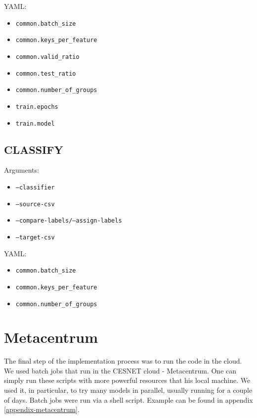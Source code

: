 \noindent
YAML:

\begin{itemize}

\item \texttt{common.batch\_size}
\item \texttt{common.keys\_per\_feature}
\item \texttt{common.valid\_ratio}
\item \texttt{common.test\_ratio}
\item \texttt{common.number\_of\_groups}
\item \texttt{train.epochs}
\item \texttt{train.model}

\end{itemize}

\subsection*{CLASSIFY}

\noindent
Arguments:

\begin{itemize}

\item \texttt{--classifier}
\item \texttt{--source-csv}
\item \texttt{--compare-labels/--assign-labels}
\item \texttt{--target-csv}

\end{itemize}

\noindent
YAML:

\begin{itemize}

\item \texttt{common.batch\_size}
\item \texttt{common.keys\_per\_feature}
\item \texttt{common.number\_of\_groups}

\end{itemize}

\section{Metacentrum}

The final step of the implementation process was to run the code in the cloud. We used batch jobs\cite{metacentrum} that run in the CESNET cloud - Metacentrum. One can simply run these scripts with more powerful resources that his local machine. We used it, in particular, to try many models in parallel, usually running for a couple of days. Batch jobs were run via a shell script. Example can be found in appendix \ref{appendix-metacentrum}.

